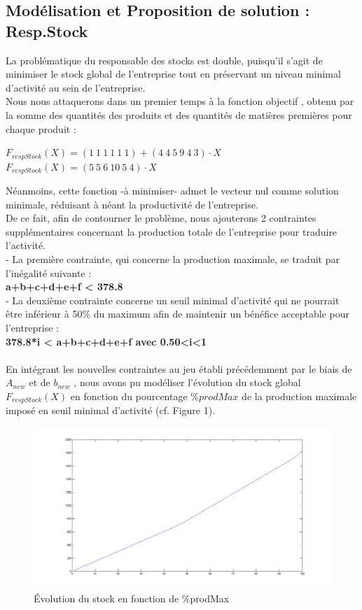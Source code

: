 \documentclass[a4paper, 11pt]{article}
\begin{document}
\subsection{Modélisation et Proposition de solution : Resp.Stock}
La problématique du responsable des stocks est double, puisqu'il s'agit de minimiser le stock global de l'entreprise tout en préservant un niveau minimal d'activité au sein de l'entreprise.\\
Nous nous attaquerons dans un premier temps à la fonction objectif , obtenu par la somme des quantités des produits et des quantités de matières premières pour chaque produit :
\begin{center}
$F_{respStock} (X) =(1~1~1~1~1~1)+(4~4~5~9~4~3)\cdot X$ \\
$F_{respStock} (X) =(5~5~6~10~5~4)\cdot X$\\
\end{center}
Néanmoins, cette fonction -à minimiser- admet le vecteur nul comme solution minimale, réduisant à néant la productivité de l'entreprise.\\
De ce fait, afin de contourner le problème, nous ajouterons 2 contraintes supplémentaires concernant la production totale de l'entreprise pour traduire l'activité.\\
- La première contrainte, qui concerne la production maximale, se traduit par l'inégalité suivante :\\
\textbf{a+b+c+d+e+f < 378.8}\\
- La deuxième contrainte concerne un seuil minimal d'activité qui ne pourrait être inférieur à 50\% du maximum afin de maintenir un bénéfice acceptable pour l'entreprise :\\
\textbf{ 378.8*i < a+b+c+d+e+f avec 0.50<i<1}\\
\\
En intégrant les nouvelles contraintes au jeu établi précédemment par le biais de \textbf{$A_{new}$} et de \textbf{$b_{new}$} , nous avons pu modéliser l'évolution du stock global $F_{respStock} (X)$ en fonction du pourcentage $\%prodMax$ de la production maximale imposé en seuil minimal d'activité (cf. Figure 1).\\
\begin{figure}[H]
    \begin{center}
        \includegraphics[scale=0.35]{Stock}
        \caption{
            \label{fig} Évolution du stock en fonction de \%prodMax
        }
    \end{center}
\end{figure}
\end{document}
